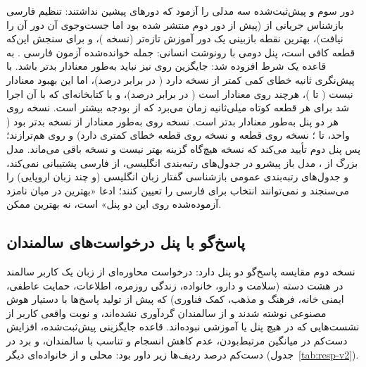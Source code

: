 دور سوم و پیش‌ثبت‌شده سه مدلی را آزمود که دورهای پیشین نداشتند: تنظیم فارسی
بازشناس جریانی  از  (پیش از دور دوم منتشر شده بود اما
جست‌وجوی آن دور آن را نیافت)، بهترین نقطه بازبینی یک دور آموزش تازه‌تر 
(نسخه )، و برای سنجش این‌که  قطعه کافی است، پنل دومی با رونوشت
انسانی:  جمله خوانده‌شده آزمون فارسی . به قاعده یک شرط افزوده
شد: جایگزین روی  نیز نباید به‌طور معنادار بدتر باشد.  با
پیش‌نگری  ثانیه خطای کمی کمتر از  نسخه  دارد ( در
برابر  درصد)، اما این بهبود معنادار نیست ( تا )، هرچند
روی  معنادار است ( در برابر  درصد)، و با کتابخانه‌ای
که با آن اجرا شد برای هر قطعه کوتاه  میلی‌ثانیه زمان می‌برد که از بودجه
بیشتر است.  نسخه  روی هر دو پنل به‌طور معنادار بدتر است. 
نسخه  روی  به‌طور معنادار از نسخه  بدتر بود ( واحد،
 تا ؛ نسخه  روی  قطعه و نسخه  روی  قطعه
خطای کمتری دارد) و روی  هم‌ترازند؛ پس پنل دوم تأیید می‌کند که نسخه
 هیچ‌گاه گزینه بهتر نیست و  نسخه  باقی می‌ماند. مدل بزرگ
 از ، مدل باز پیشرو در جدول‌های رتبه‌بندی
انگلیسی، از فارسی پشتیبانی نمی‌کند، و جدول‌های رتبه‌بندی عمومی بازشناسی گفتار
زبان انگلیسی (و چند زبان اروپایی) را می‌سنجند و نمی‌توانند انتخاب برای فارسی را
تعیین کنند؛ ادعا «بهترین در میان  نامزد آزموده‌شده روی این دو پنل» است، نه
بهترین ممکن.

\subsection{پاسخ‌گو با پنل درخواست‌های سالمندان}

نسخه دوم مقایسه پاسخ‌گو دو پنل دارد:  درخواست محاوره‌ای از زبان یک کاربر سالمند در
هشت دسته (سلامت و دارو، خانواده، زندگی روزمره، اطلاعات، حمایت عاطفی،
ایمنی خانه، فرهنگ و مذهب، کمک فناوری) که پیش از تولید پاسخ‌ها با دستیار هوش مصنوعی
 نوشته شدند و از سالمندان گردآوری نشده‌اند، و
 نوبت واقعی کاربر از نشست‌هایی که در هیچ پنل یا آموزشی نبوده‌اند. قاعده
جایگزینی پیش‌ثبت‌شده، افزایش دست‌کم  در میانگین مرتبط‌بودن، عدم
کاهش انسجام و تناسب با سالمندان، و برد در دست‌کم  درصد ردیف‌ها زیر
 داور بود:  محلی و  از خانواده‌ای
دیگر (جدول~\ref{tab:resp-v2}).

